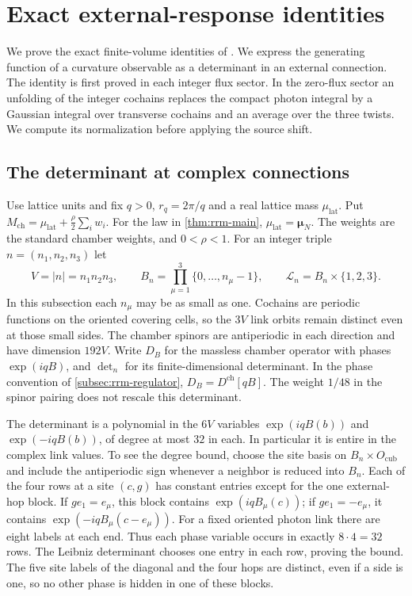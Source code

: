 \section{Exact external-response identities}\label{sec:external-response}

We prove the exact finite-volume identities of
\cite[\S20]{QED3Master}. We express the generating function of a curvature observable as a
determinant in an external connection. The identity is first proved
in each integer flux sector. In the zero-flux sector an unfolding
of the integer cochains replaces the compact photon integral by a
Gaussian integral over transverse cochains and an average over the
three twists. We compute its normalization before applying the
source shift.

\subsection{The determinant at complex connections}
\label{subsec:external-complex-determinant}

Use lattice units and fix $q>0$, $r_q=2\pi/q$ and a real lattice
mass $\mu_{\mathrm{lat}}$. Put
$M_{\mathrm{ch}}=\mu_{\mathrm{lat}}+\frac{\rho}{2}\sum_iw_i$.
For the law in \cref{thm:rrm-main},
$\mu_{\mathrm{lat}}=\boldsymbol\mu_N$.
The weights are the standard chamber weights, and $0<\rho<1$.
For an integer triple $n=(n_1,n_2,n_3)$ let
\[
 V=|n|=n_1n_2n_3,\qquad
 B_n=\prod_{\mu=1}^3\{0,\ldots,n_\mu-1\},\qquad
 \mathcal L_n=B_n\times\{1,2,3\}.
\]
In this subsection each $n_\mu$ may be as small as one.
Cochains are periodic functions on the oriented covering cells,
so the $3V$ link orbits remain distinct even at those small sides.
The chamber spinors are antiperiodic in each direction and have
dimension $192V$. Write $D_B$ for the massless chamber operator
with phases $\exp(iqB)$, and $\det_n$ for its finite-dimensional
determinant. In the phase convention of
\cref{subsec:rrm-regulator}, $D_B=D^{\mathrm{ch}}[qB]$.
The weight $1/48$ in the spinor pairing does not rescale this
determinant.

The determinant is a polynomial in the $6V$ variables
$\exp(iqB(b))$ and $\exp(-iqB(b))$, of degree at most $32$
in each. In particular it is entire in the complex link values.
To see the degree bound, choose the site basis on
$B_n\times O_{\mathrm{cub}}$ and include the antiperiodic sign
whenever a neighbor is reduced into $B_n$. Each of the four
rows at a site $(c,g)$ has constant entries except for the
one external-hop block. If $ge_1=e_\mu$, this block contains
$\exp(iqB_\mu(c))$; if $ge_1=-e_\mu$, it contains
$\exp(-iqB_\mu(c-e_\mu))$. For a fixed oriented photon link
there are eight labels at each end. Thus each phase variable
occurs in exactly $8\cdot4=32$ rows. The Leibniz determinant
chooses one entry in each row, proving the bound. The five
site labels of the diagonal and the four hops are distinct,
even if a side is one, so no other phase is hidden in one
of these blocks.

